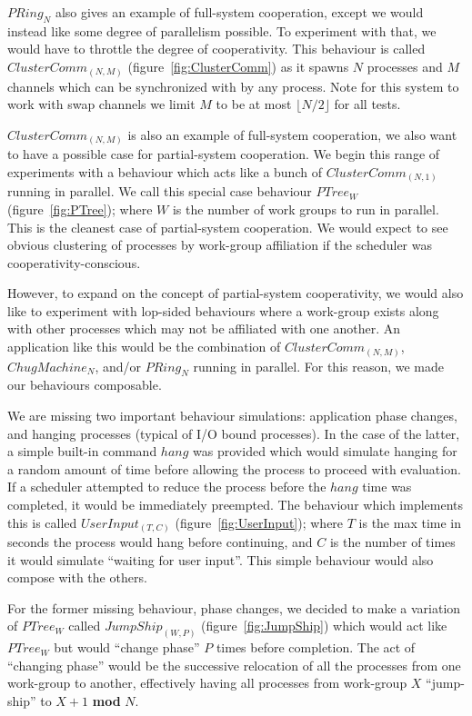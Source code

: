 $PRing_N$ also gives an example of full-system cooperation, except we would 
instead like some degree of parallelism possible. To experiment with that, we 
would have to throttle the degree of cooperativity. This behaviour is called
$ClusterComm_{(N,M)}$ (figure~\ref{fig:ClusterComm}) as it spawns $N$ processes and $M$ channels which can be
synchronized with by any process. Note for this system to work with swap 
channels we limit $M$ to be at most $\lfloor N/2 \rfloor$ for all tests. 

$ClusterComm_{(N,M)}$ is also an example of full-system cooperation, we also
want to have a possible case for partial-system cooperation. We begin this range
of experiments with a behaviour which acts like a bunch of $ClusterComm_{(N,1)}$
running in parallel. We call this special case behaviour $PTree_W$ (figure~\ref{fig:PTree}); where $W$ is 
the number of work groups to run in parallel. This is the cleanest case of 
partial-system cooperation. We would expect to see obvious clustering of 
processes by work-group affiliation if the scheduler was 
cooperativity-conscious.

However, to expand on the concept of partial-system cooperativity, we would 
also like to experiment with lop-sided behaviours where a work-group exists 
along with other processes which may not be affiliated with one another. An 
application like this would be the combination of $ClusterComm_{(N,M)}$, 
$ChugMachine_N$, and/or $PRing_N$ running in parallel. For this reason, we made
our behaviours composable.

We are missing two important behaviour simulations: application phase changes,
and hanging processes (typical of I/O bound processes). In the case of the 
latter, a simple built-in command $hang$ was provided which would simulate 
hanging for a random amount of time before allowing the process to proceed with
evaluation. If a scheduler attempted to reduce the process before the $hang$ 
time was completed, it would be immediately preempted. The behaviour which 
implements this is called $UserInput_{(T,C)}$ (figure~\ref{fig:UserInput}); where $T$ is the max time in seconds
the process would hang before continuing, and $C$ is the number of times it 
would simulate ``waiting for user input''. This simple behaviour would also
compose with the others.

For the former missing behaviour, phase changes, we decided to make a variation
of $PTree_W$ called $JumpShip_{(W,P)}$ (figure~\ref{fig:JumpShip}) which would act like $PTree_W$ but would
``change phase'' $P$ times before completion. The act of ``changing phase'' would 
be the successive relocation of all the processes from one work-group to 
another, effectively having all processes from work-group $X$ ``jump-ship'' to
$X+1$ \textbf{mod} $N$.

